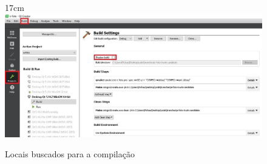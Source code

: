 \begin{figure}[!ht]{17cm}
 	\centering
	\includegraphics[width=15cm]{Figuras/projectbuild.jpg}
	\caption{Locais buscados para a compilação} \label{fig:projectbuild}
\end{figure}
 